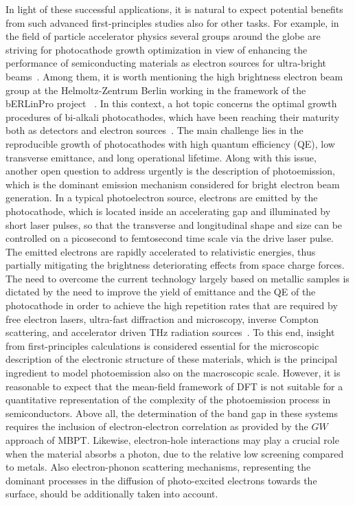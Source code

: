 \documentclass[aps,pra,superscriptaddress,twocolumn]{revtex4}
\begin{document}
In light of these successful applications, it is natural to expect potential benefits from such advanced first-principles studies also for other tasks.
For example, in the field of particle accelerator physics several groups around the globe are striving for photocathode growth optimization in view of enhancing the performance of semiconducting materials as electron sources for ultra-bright beams~\cite{dowe+10nimpra,musu+18nimpra}.
Among them, it is worth mentioning the high brightness electron beam group at the Helmoltz-Zentrum Berlin working in the framework of the bERLinPro project ~\cite{abo+17proceeding,neum+18ipac}.
In this context, a hot topic concerns the optimal growth procedures of bi-alkali photocathodes, which have been reaching their maturity both as detectors and electron sources~\cite{dowe+93apl}.
The main challenge lies in the reproducible growth of photocathodes with high quantum efficiency (QE), low transverse emittance, and long operational lifetime. 
Along with this issue, another open question to address urgently is the description of photoemission, which is the dominant emission mechanism considered for bright electron beam generation. 
In a typical photoelectron source, electrons are emitted by the photocathode, which is located inside an accelerating gap and illuminated by short laser pulses, so that the transverse and longitudinal shape and size can be controlled on a picosecond to femtosecond time scale via the drive laser pulse. 
The emitted electrons are rapidly accelerated to relativistic energies, thus partially mitigating the brightness deteriorating effects from space charge forces.
The need to overcome the current technology largely based on metallic samples is dictated by the need to improve the yield of emittance and the QE of the photocathode in order to achieve the high repetition rates that are required by free electron lasers, ultra-fast diffraction and microscopy, inverse Compton scattering, and accelerator driven THz radiation sources~\cite{bouc+09nimpra,musu+10rsi,musu+18nimpra}.
To this end, insight from first-principles calculations is considered essential for the microscopic description of the electronic structure of these materials, which is the principal ingredient to model photoemission also on the macroscopic scale.
However, it is reasonable to expect that the mean-field framework of DFT is not suitable for a quantitative representation of the complexity of the photoemission process in semiconductors.
Above all, the determination of the band gap in these systems requires the inclusion of electron-electron correlation as provided by the $GW$ approach of MBPT. 
Likewise, electron-hole interactions may play a crucial role when the material absorbs a photon, due to the relative low screening compared to metals. 
Also electron-phonon scattering mechanisms, representing the dominant processes in the diffusion of photo-excited electrons towards the surface, should be additionally taken into account.
\end{document}

